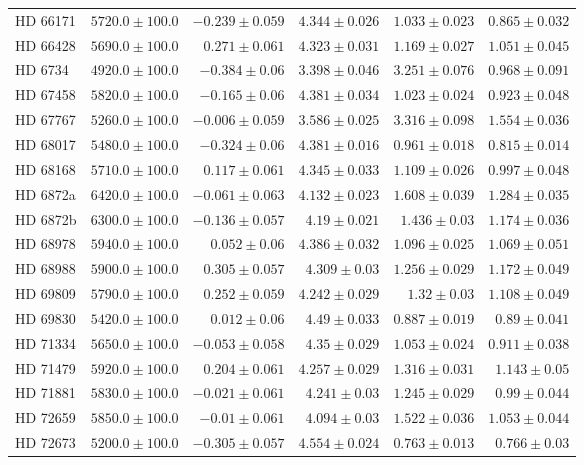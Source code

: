 \begin{longtable*}{lrrrrr}
HD 66171 & $5720.0\pm 100.0$ & $-0.239\pm 0.059$ & $4.344\pm 0.026$ & $1.033\pm 0.023$ & $0.865\pm 0.032$ \\ 
HD 66428 & $5690.0\pm 100.0$ & $0.271\pm 0.061$ & $4.323\pm 0.031$ & $1.169\pm 0.027$ & $1.051\pm 0.045$ \\ 
HD 6734 & $4920.0\pm 100.0$ & $-0.384\pm 0.06$ & $3.398\pm 0.046$ & $3.251\pm 0.076$ & $0.968\pm 0.091$ \\ 
HD 67458 & $5820.0\pm 100.0$ & $-0.165\pm 0.06$ & $4.381\pm 0.034$ & $1.023\pm 0.024$ & $0.923\pm 0.048$ \\ 
HD 67767 & $5260.0\pm 100.0$ & $-0.006\pm 0.059$ & $3.586\pm 0.025$ & $3.316\pm 0.098$ & $1.554\pm 0.036$ \\ 
HD 68017 & $5480.0\pm 100.0$ & $-0.324\pm 0.06$ & $4.381\pm 0.016$ & $0.961\pm 0.018$ & $0.815\pm 0.014$ \\ 
HD 68168 & $5710.0\pm 100.0$ & $0.117\pm 0.061$ & $4.345\pm 0.033$ & $1.109\pm 0.026$ & $0.997\pm 0.048$ \\ 
HD 6872a & $6420.0\pm 100.0$ & $-0.061\pm 0.063$ & $4.132\pm 0.023$ & $1.608\pm 0.039$ & $1.284\pm 0.035$ \\ 
HD 6872b & $6300.0\pm 100.0$ & $-0.136\pm 0.057$ & $4.19\pm 0.021$ & $1.436\pm 0.03$ & $1.174\pm 0.036$ \\ 
HD 68978 & $5940.0\pm 100.0$ & $0.052\pm 0.06$ & $4.386\pm 0.032$ & $1.096\pm 0.025$ & $1.069\pm 0.051$ \\ 
HD 68988 & $5900.0\pm 100.0$ & $0.305\pm 0.057$ & $4.309\pm 0.03$ & $1.256\pm 0.029$ & $1.172\pm 0.049$ \\ 
HD 69809 & $5790.0\pm 100.0$ & $0.252\pm 0.059$ & $4.242\pm 0.029$ & $1.32\pm 0.03$ & $1.108\pm 0.049$ \\ 
HD 69830 & $5420.0\pm 100.0$ & $0.012\pm 0.06$ & $4.49\pm 0.033$ & $0.887\pm 0.019$ & $0.89\pm 0.041$ \\ 
HD 71334 & $5650.0\pm 100.0$ & $-0.053\pm 0.058$ & $4.35\pm 0.029$ & $1.053\pm 0.024$ & $0.911\pm 0.038$ \\ 
HD 71479 & $5920.0\pm 100.0$ & $0.204\pm 0.061$ & $4.257\pm 0.029$ & $1.316\pm 0.031$ & $1.143\pm 0.05$ \\ 
HD 71881 & $5830.0\pm 100.0$ & $-0.021\pm 0.061$ & $4.241\pm 0.03$ & $1.245\pm 0.029$ & $0.99\pm 0.044$ \\ 
HD 72659 & $5850.0\pm 100.0$ & $-0.01\pm 0.061$ & $4.094\pm 0.03$ & $1.522\pm 0.036$ & $1.053\pm 0.044$ \\ 
HD 72673 & $5200.0\pm 100.0$ & $-0.305\pm 0.057$ & $4.554\pm 0.024$ & $0.763\pm 0.013$ & $0.766\pm 0.03$ \\ 

\end{longtable*}
